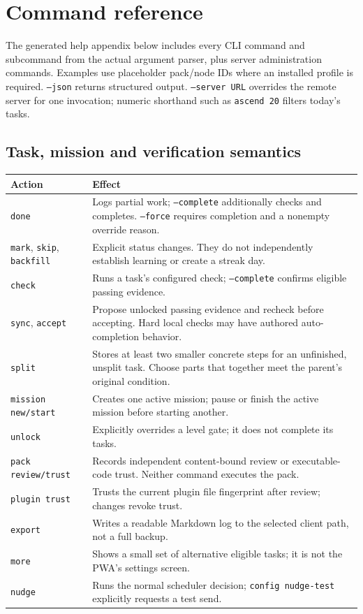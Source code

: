 \section{Command reference}
The generated help appendix below includes every CLI command and subcommand from
the actual argument parser, plus server administration commands. Examples use
placeholder pack/node IDs where an installed profile is required. \texttt{--json}
returns structured output. \texttt{--server URL} overrides the remote server for
one invocation; numeric shorthand such as \texttt{ascend 20} filters today's tasks.

\subsection{Task, mission and verification semantics}
\begin{longtable}{p{}p{}}
\textbf{Action} & \textbf{Effect}\\\hline
\texttt{done} & Logs partial work; \texttt{--complete} additionally checks and completes. \texttt{--force} requires completion and a nonempty override reason.\\
\texttt{mark}, \texttt{skip}, \texttt{backfill} & Explicit status changes. They do not independently establish learning or create a streak day.\\
\texttt{check} & Runs a task's configured check; \texttt{--complete} confirms eligible passing evidence.\\
\texttt{sync}, \texttt{accept} & Propose unlocked passing evidence and recheck before accepting. Hard local checks may have authored auto-completion behavior.\\
\texttt{split} & Stores at least two smaller concrete steps for an unfinished, unsplit task. Choose parts that together meet the parent's original condition.\\
\texttt{mission new/start} & Creates one active mission; pause or finish the active mission before starting another.\\
\texttt{unlock} & Explicitly overrides a level gate; it does not complete its tasks.\\
\texttt{pack review/trust} & Records independent content-bound review or executable-code trust. Neither command executes the pack.\\
\texttt{plugin trust} & Trusts the current plugin file fingerprint after review; changes revoke trust.\\
\texttt{export} & Writes a readable Markdown log to the selected client path, not a full backup.\\
\texttt{more} & Shows a small set of alternative eligible tasks; it is not the PWA's settings screen.\\
\texttt{nudge} & Runs the normal scheduler decision; \texttt{config nudge-test} explicitly requests a test send.\\
\end{longtable}

